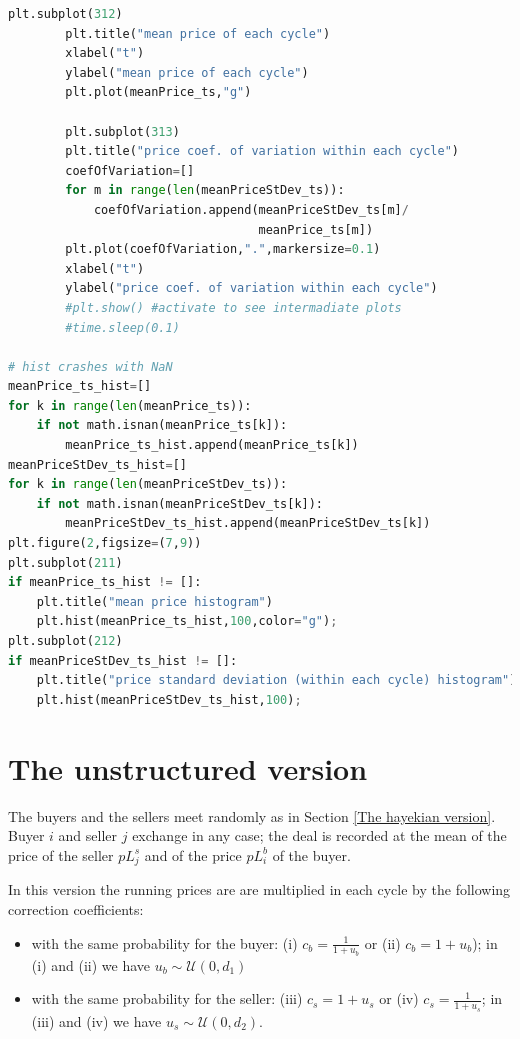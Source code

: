 \documentclass[10pt]{report}
\begin{document}
\begin{lstlisting}[language=Python, caption=The model in the simplified hayekian perspective, basicstyle=\ttfamily\footnotesize]
        plt.subplot(312)
        plt.title("mean price of each cycle")
        xlabel("t")
        ylabel("mean price of each cycle")
        plt.plot(meanPrice_ts,"g")
        
        plt.subplot(313)
        plt.title("price coef. of variation within each cycle")
        coefOfVariation=[]
        for m in range(len(meanPriceStDev_ts)):
            coefOfVariation.append(meanPriceStDev_ts[m]/
                                   meanPrice_ts[m])
        plt.plot(coefOfVariation,".",markersize=0.1)
        xlabel("t")
        ylabel("price coef. of variation within each cycle")
        #plt.show() #activate to see intermadiate plots
        #time.sleep(0.1)

# hist crashes with NaN
meanPrice_ts_hist=[]
for k in range(len(meanPrice_ts)): 
    if not math.isnan(meanPrice_ts[k]):
        meanPrice_ts_hist.append(meanPrice_ts[k])
meanPriceStDev_ts_hist=[]
for k in range(len(meanPriceStDev_ts)): 
    if not math.isnan(meanPriceStDev_ts[k]):
        meanPriceStDev_ts_hist.append(meanPriceStDev_ts[k])
plt.figure(2,figsize=(7,9))
plt.subplot(211)
if meanPrice_ts_hist != []:
    plt.title("mean price histogram")
    plt.hist(meanPrice_ts_hist,100,color="g");
plt.subplot(212)
if meanPriceStDev_ts_hist != []:
    plt.title("price standard deviation (within each cycle) histogram")
    plt.hist(meanPriceStDev_ts_hist,100);
\end{lstlisting}


\section{The unstructured version}\label{The unstructured version}

The buyers and the sellers meet randomly as in Section \ref{The hayekian version}. Buyer $i$ and seller $j$ exchange in any case; the deal is recorded at the mean of the price of the seller $pL^s_j$ and of the price $pL^b_i$ of the buyer.

In this version the running prices are  are multiplied in each cycle by the following  correction coefficients:

\begin{itemize}

\item with the same probability for the buyer: (i) $c_b=\frac{1} {1 + u_b}$ or (ii) $c_b=1 + u_b$); in (i) and (ii) we have $u_b\sim\mathcal{U}(0,d_1)$

\item  with the same probability for the seller: (iii) $c_s=1 + u_s$ or (iv) $c_s=\frac{1} {1 + u_s}$; in (iii) and (iv) we have $u_s\sim\mathcal{U}(0,d_2)$.
\end{itemize}
\end{document}
